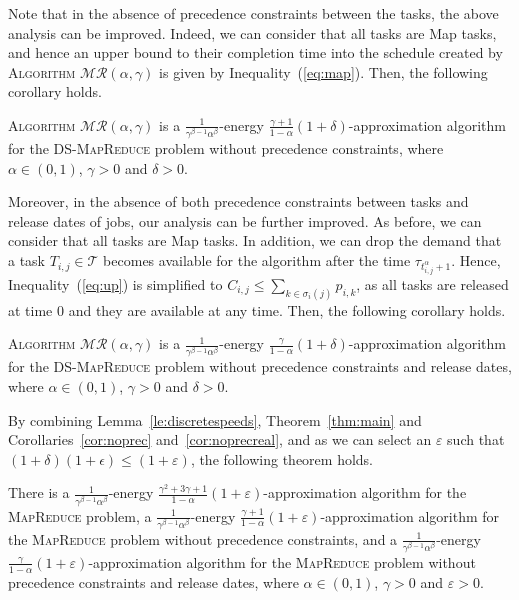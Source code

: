 \documentclass{llncs}
\newcommand{\mr}{\textsc{MapReduce}\xspace}
\newcommand{\dmr}{\textsc{DS-MapReduce}\xspace}
\newcommand{\algomr}{\textsc{Algorithm} $\mathcal{MR}(\alpha,\gamma)$\xspace}
\begin{document}
Note that in the absence of precedence constraints between the tasks, the above analysis can be improved.
Indeed, we can consider that all tasks are Map tasks,
and hence an upper bound to their completion time into the schedule created by \algomr is given by Inequality~(\ref{eq:map}).
Then, the following corollary holds.

\begin{corollary} \label{cor:noprec}
\algomr is a $\frac{1}{\gamma^{\beta-1}\alpha^{\beta}}$-energy $\frac{\gamma+1}{1-\alpha}(1+\delta)$-approximation algorithm for the \dmr problem without precedence constraints,
where $\alpha\in(0,1)$, $\gamma>0$ and $\delta>0$.
\end{corollary}

Moreover, in the absence of both precedence constraints between tasks and release dates of jobs, our analysis can be further improved.
As before, we can consider that all tasks are Map tasks.
In addition, we can drop the demand that a task $T_{i,j} \in \mathcal{T}$ becomes available for the algorithm after the time $\tau_{t_{i,j}^{\alpha}+1}$.
Hence, Inequality~(\ref{eq:up}) is simplified to $C_{i,j} \leq \sum_{k \in \sigma_i(j)} p_{i,k}$,
as all tasks are released at time 0 and they are available at any time.
Then, the following corollary holds.

\begin{corollary} \label{cor:noprecreal}
\algomr is a $\frac{1}{\gamma^{\beta-1}\alpha^{\beta}}$-energy $\frac{\gamma}{1-\alpha}(1+\delta)$-approximation algorithm
for the \dmr problem without precedence constraints and release dates,
where $\alpha\in(0,1)$, $\gamma>0$ and $\delta>0$.
\end{corollary}

By combining Lemma~\ref{le:discretespeeds}, Theorem~\ref{thm:main} and Corollaries~\ref{cor:noprec} and~\ref{cor:noprecreal},
and as we can select an $\varepsilon$ such that $(1+\delta)(1+\epsilon)\leq(1+\varepsilon)$, the following theorem holds.

\begin{theorem}
There is a $\frac{1}{\gamma^{\beta-1}\alpha^{\beta}}$-energy $\frac{\gamma^2+3\gamma+1}{1-\alpha}(1+\varepsilon)$-approximation algorithm for the \mr problem,
a $\frac{1}{\gamma^{\beta-1}\alpha^{\beta}}$-energy $\frac{\gamma+1}{1-\alpha}(1+\varepsilon)$-approximation algorithm for the \mr problem without precedence constraints,
and a $\frac{1}{\gamma^{\beta-1}\alpha^{\beta}}$-energy $\frac{\gamma}{1-\alpha}(1+\varepsilon)$-approximation algorithm for the \mr problem without precedence constraints and release dates,
where $\alpha\in(0,1)$, $\gamma>0$ and $\varepsilon>0$.
\end{theorem}
\end{document}
